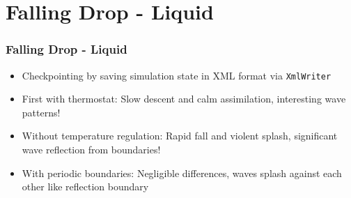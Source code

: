 
\section{Falling Drop - Liquid}
\label{sec:falling}

\begin{frame}
    \frametitle{Falling Drop - Liquid}
    \begin{itemize}
        \item Checkpointing by saving simulation state in XML format via \texttt{XmlWriter}
        \item First with thermostat: Slow descent and calm assimilation, interesting wave patterns!
        \item Without temperature regulation: Rapid fall and violent splash, significant wave reflection from boundaries!
        \item With periodic boundaries: Negligible differences, waves splash against each other like reflection boundary
    \end{itemize}
\end{frame}